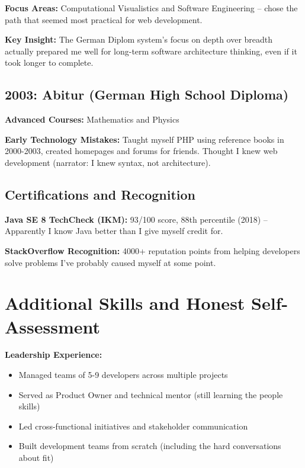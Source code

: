 \documentclass[11pt,a4paper]{article}
\begin{document}
\textbf{Focus Areas:} Computational Visualistics and Software Engineering -- chose the path that seemed most practical for web development.

\textbf{Key Insight:} The German Diplom system's focus on depth over breadth actually prepared me well for long-term software architecture thinking, even if it took longer to complete.

\vspace{4pt}

\subsection{2003: Abitur (German High School Diploma)}
\textbf{Advanced Courses:} Mathematics and Physics

\textbf{Early Technology Mistakes:} Taught myself PHP using reference books in 2000-2003, created homepages and forums for friends. Thought I knew web development (narrator: I knew syntax, not architecture).

\vspace{4pt}

\subsection{Certifications and Recognition}

\textbf{Java SE 8 TechCheck (IKM):} 93/100 score, 88th percentile (2018) -- Apparently I know Java better than I give myself credit for.

\textbf{StackOverflow Recognition:} 4000+ reputation points from helping developers solve problems I've probably caused myself at some point.

\vspace{6pt}

\section{Additional Skills and Honest Self-Assessment}

\textbf{Leadership Experience:}
\begin{itemize}[leftmargin=15pt, topsep=0pt, itemsep=1pt]
\item Managed teams of 5-9 developers across multiple projects
\item Served as Product Owner and technical mentor (still learning the people skills)
\item Led cross-functional initiatives and stakeholder communication
\item Built development teams from scratch (including the hard conversations about fit)
\end{itemize}
\end{document}
